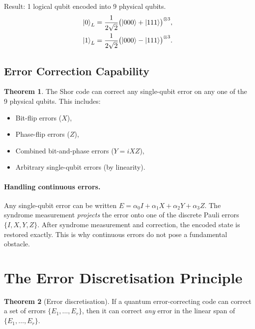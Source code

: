 \documentclass[11pt]{article}
\theoremstyle{definition}
\newtheorem{theorem}{Theorem}[section]
\begin{document}
Result: 1 logical qubit encoded into 9 physical qubits.
\begin{align}
    \ket{0}_L &= \frac{1}{2\sqrt{2}}\bigl(\ket{000}+\ket{111}\bigr)^{\otimes 3}, \\
    \ket{1}_L &= \frac{1}{2\sqrt{2}}\bigl(\ket{000}-\ket{111}\bigr)^{\otimes 3}.
\end{align}

\subsection{Error Correction Capability}

\begin{theorem}
The Shor code can correct any single-qubit error on any one of the 9 physical qubits.  This includes:
\begin{itemize}
    \item Bit-flip errors ($X$),
    \item Phase-flip errors ($Z$),
    \item Combined bit-and-phase errors ($Y=iXZ$),
    \item Arbitrary single-qubit errors (by linearity).
\end{itemize}
\end{theorem}

\paragraph{Handling continuous errors.}
Any single-qubit error can be written $E = \alpha_0 I + \alpha_1 X + \alpha_2 Y + \alpha_3 Z$.  The syndrome measurement \emph{projects} the error onto one of the discrete Pauli errors $\{I,X,Y,Z\}$.  After syndrome measurement and correction, the encoded state is restored exactly.  This is why continuous errors do not pose a fundamental obstacle.

\section{The Error Discretisation Principle}

\begin{theorem}[Error discretisation]
If a quantum error-correcting code can correct a set of errors $\{E_1,\dots,E_r\}$, then it can correct \emph{any} error in the linear span of $\{E_1,\dots,E_r\}$.
\end{theorem}
\end{document}

